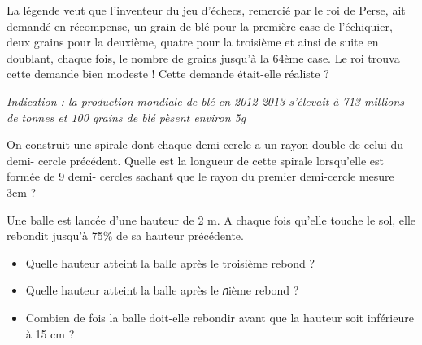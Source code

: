 \documentclass[a4paper,12pt]{report}
\begin{document}
\begin{exercice}
La légende veut que l’inventeur du jeu d’échecs, remercié par le roi de Perse, ait
demandé en récompense, un grain de blé pour la première case de l’échiquier, deux
grains pour la deuxième, quatre pour la troisième et ainsi de suite en doublant, chaque
fois, le nombre de grains jusqu’à la 64ème case. Le roi trouva cette demande bien
modeste ! Cette demande était-elle réaliste ?

\emph{Indication : la production mondiale de blé en 2012-2013 s’élevait à 713 millions de
tonnes et 100 grains de blé pèsent environ 5g}
\end{exercice}

\begin{exercice}
On construit une spirale dont chaque demi-cercle a un rayon double de celui du demi-
cercle précédent. Quelle est la longueur de cette spirale lorsqu’elle est formée de 9 demi-
cercles sachant que le rayon du premier demi-cercle mesure 3cm ?
\end{exercice}

\begin{exercice}
Une balle est lancée d’une hauteur de 2 m. A chaque fois qu’elle touche le sol, elle
rebondit jusqu’à 75\% de sa hauteur précédente.
\begin{itemize}
\item Quelle hauteur atteint la balle après le troisième rebond ?
\item Quelle hauteur atteint la balle après le 𝑛ième rebond ?
\item Combien de fois la balle doit-elle rebondir avant que la hauteur
soit inférieure à 15 cm ?
\end{itemize}
\end{exercice}
\end{document}
